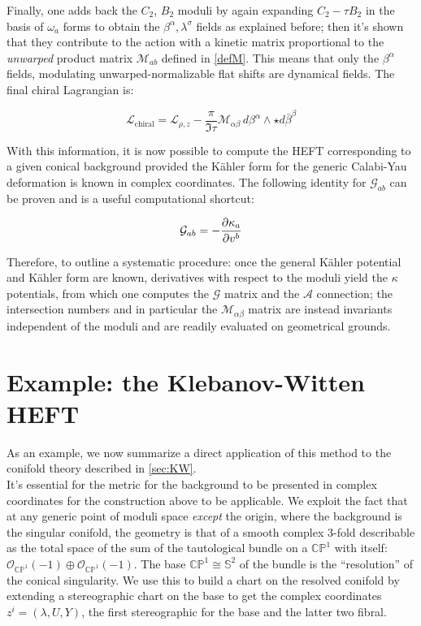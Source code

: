 Finally, one adds back the $C_2$, $B_2$ moduli by again expanding $C_2 - \tau B_2$ in the basis of $\omega_a$ forms to obtain the $\beta^\alpha, \lambda^\sigma$ fields as explained before; then it's shown that they contribute to the action with a kinetic matrix proportional to the \emph{unwarped} product matrix $\mathcal{M}_{ab}$ defined in \ref{defM}. This means that only the $\beta^\alpha$ fields, modulating unwarped-normalizable flat shifts are dynamical fields. The final chiral Lagrangian is:

\begin{equation}
	\mathcal{L}_\text{chiral} = \mathcal{L}_{\rho,z} - \frac{\pi}{\Im\tau} \mathcal{M}_{\alpha\beta} \,d\beta^\alpha \wedge \star d\bar \beta^\beta
	\label{}
\end{equation}

With this information, it is now possible to compute the HEFT corresponding to a given conical background provided the K\"ahler form for the generic Calabi-Yau deformation is known in complex coordinates. The following identity for $\mathcal{G}_{ab}$ can be proven\cite{MZ} and is a useful computational shortcut:

\begin{equation}
	\mathcal{G}_{ab} = - \frac{\partial\kappa_a}{\partial v^b}
	\label{}
\end{equation}

Therefore, to outline a systematic procedure: once the general K\"ahler potential and K\"ahler form are known, derivatives with respect to the moduli yield the $\kappa$ potentials, from which one computes the $\mathcal{G}$ matrix and the $\mathcal{A}$ connection; the intersection numbers and in particular the $\mathcal{M}_{\alpha\beta}$ matrix are instead invariants independent of the moduli and are readily evaluated on geometrical grounds.

\section{Example: the Klebanov-Witten HEFT}

As an example, we now summarize a direct application of this method to the conifold theory described in \ref{sec:KW}.\\

It's essential for the metric for the background to be presented in complex coordinates for the construction above to be applicable. We exploit the fact that at any generic point of moduli space \emph{except} the origin, where the background is the singular conifold, the geometry is that of a smooth complex 3-fold describable as the total space of the sum of the tautological bundle on a $\mathbb{CP}^1$ with itself: $\mathcal{O}_{\mathbb{CP}^1}(-1) \oplus \mathcal{O}_{\mathbb{CP}^1}(-1)$. The base $\mathbb{CP}^1 \cong \mathbb{S}^2$ of the bundle is the ``resolution'' of the conical singularity. We use this to build a chart on the resolved conifold by extending a stereographic chart on the base to get the complex coordinates $z^i = (\lambda, U, Y)$, the first stereographic for the base and the latter two fibral.\\

